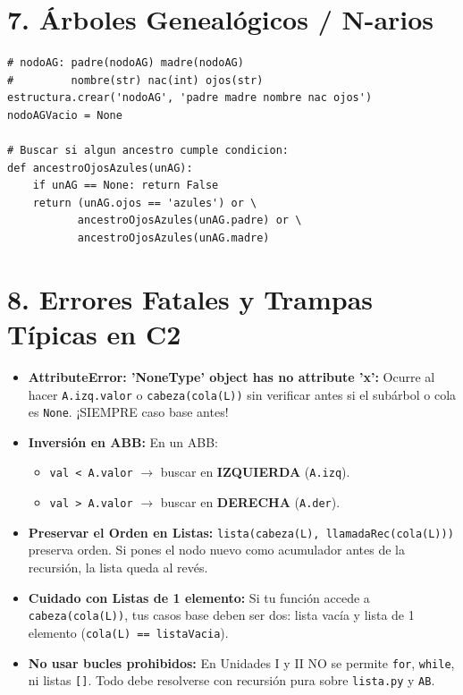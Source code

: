 \documentclass[8pt,twocolumn]{extarticle}
\begin{document}
\section{7. Árboles Genealógicos / N-arios}
\begin{verbatim}
# nodoAG: padre(nodoAG) madre(nodoAG)
#         nombre(str) nac(int) ojos(str)
estructura.crear('nodoAG', 'padre madre nombre nac ojos')
nodoAGVacio = None

# Buscar si algun ancestro cumple condicion:
def ancestroOjosAzules(unAG):
    if unAG == None: return False
    return (unAG.ojos == 'azules') or \
           ancestroOjosAzules(unAG.padre) or \
           ancestroOjosAzules(unAG.madre)
\end{verbatim}

\section{8. Errores Fatales y Trampas Típicas en C2}
\begin{itemize}
    \item \textbf{AttributeError: 'NoneType' object has no attribute 'x':} Ocurre al hacer \texttt{A.izq.valor} o \texttt{cabeza(cola(L))} sin verificar antes si el subárbol o cola es \texttt{None}. ¡SIEMPRE caso base antes!
    \item \textbf{Inversión en ABB:} En un ABB:
    \begin{itemize}
        \item \texttt{val < A.valor} $\rightarrow$ buscar en \textbf{IZQUIERDA} (\texttt{A.izq}).
        \item \texttt{val > A.valor} $\rightarrow$ buscar en \textbf{DERECHA} (\texttt{A.der}).
    \end{itemize}
    \item \textbf{Preservar el Orden en Listas:}
    \texttt{lista(cabeza(L), llamadaRec(cola(L)))} preserva orden. Si pones el nodo nuevo como acumulador antes de la recursión, la lista queda al revés.
    \item \textbf{Cuidado con Listas de 1 elemento:} Si tu función accede a \texttt{cabeza(cola(L))}, tus casos base deben ser dos: lista vacía y lista de 1 elemento (\texttt{cola(L) == listaVacia}).
    \item \textbf{No usar bucles prohibidos:} En Unidades I y II NO se permite \texttt{for}, \texttt{while}, ni listas \texttt{[]}. Todo debe resolverse con recursión pura sobre \texttt{lista.py} y \texttt{AB}.
\end{itemize}
\end{document}
